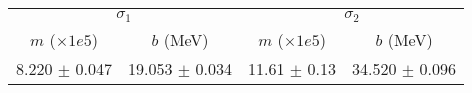 \begin{tabular}{cc|cc}
\multicolumn{2}{c|}{$\sigma_1$} & \multicolumn{2}{|c}{$\sigma_2$} \\
$m$ ($\times1e5$) & $b$ (MeV) & $m$ ($\times1e5$) & $b$ (MeV) \\
\hline
8.220 $\pm$ 0.047 & 19.053 $\pm$ 0.034 & 11.61 $\pm$ 0.13 & 34.520 $\pm$ 0.096\\
\end{tabular}
